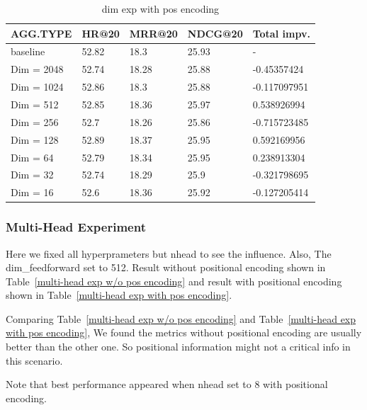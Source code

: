 \documentclass{article}
\begin{document}
\begin{table}
    \caption{dim exp with pos encoding}
    \label{dim exp with pos encoding}
    \centering
    \begin{tabular}{lllll}
        \toprule
        AGG.TYPE   & HR@20 & MRR@20 & NDCG@20 & Total impv.  \\
        \midrule
        baseline   & 52.82 & 18.3   & 25.93   & -            \\
        Dim = 2048 & 52.74 & 18.28  & 25.88   & -0.45357424  \\
        Dim = 1024 & 52.86 & 18.3   & 25.88   & -0.117097951 \\
        Dim = 512  & 52.85 & 18.36  & 25.97   & 0.538926994  \\
        Dim = 256  & 52.7  & 18.26  & 25.86   & -0.715723485 \\
        Dim = 128  & 52.89 & 18.37  & 25.95   & 0.592169956  \\
        Dim = 64   & 52.79 & 18.34  & 25.95   & 0.238913304  \\
        Dim = 32   & 52.74 & 18.29  & 25.9    & -0.321798695 \\
        Dim = 16   & 52.6  & 18.36  & 25.92   & -0.127205414 \\
        \bottomrule
    \end{tabular}
\end{table}

\subsubsection{Multi-Head Experiment}

Here we fixed all hyperprameters but nhead to see the influence.
Also, The dim\_feedforward set to 512.
Result without positional encoding shown in
Table~\ref{multi-head exp w/o pos encoding} and result with
positional encoding shown in Table~\ref{multi-head exp with pos encoding}.

Comparing  Table~\ref{multi-head exp w/o pos encoding} and
Table~\ref{multi-head exp with pos encoding},
We found the metrics without positional encoding are usually
better than the other one.
So positional information might not a critical info in this scenario.

Note that best performance appeared when nhead set to 8 with positional encoding.
\end{document}
